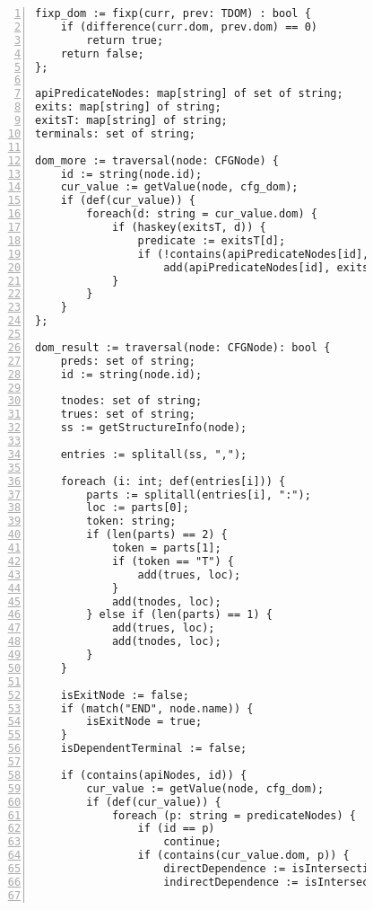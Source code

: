 \begin{figure}[ht!]
\begin{lstlisting}[numbers=left, tabsize=4, escapechar=@, caption={API Usage Mining Analysis},label={lst:aun-code}, lastline = 10]
fixp_dom := fixp(curr, prev: TDOM) : bool {
 	if (difference(curr.dom, prev.dom) == 0)
 		return true;	
 	return false;
};

apiPredicateNodes: map[string] of set of string;
exits: map[string] of string;
exitsT: map[string] of string;
terminals: set of string;

dom_more := traversal(node: CFGNode) {
    id := string(node.id);
    cur_value := getValue(node, cfg_dom);
    if (def(cur_value)) {
        foreach(d: string = cur_value.dom) {
            if (haskey(exitsT, d)) {
                predicate := exitsT[d];  
                if (!contains(apiPredicateNodes[id], predicate))
                    add(apiPredicateNodes[id], exits[d]);
            }
        }
    }
};

dom_result := traversal(node: CFGNode): bool {
    preds: set of string;
    id := string(node.id);
    
    tnodes: set of string;
    trues: set of string;
    ss := getStructureInfo(node);
    
    entries := splitall(ss, ",");
    
    foreach (i: int; def(entries[i])) {
    	parts := splitall(entries[i], ":"); 
    	loc := parts[0]; 
    	token: string;
    	if (len(parts) == 2) {
    	    token = parts[1];
    		if (token == "T") {
    		    add(trues, loc);    
    		}
            add(tnodes, loc);
    	} else if (len(parts) == 1) {
    	    add(trues, loc);  
    		add(tnodes, loc);
    	}
    }
    
    isExitNode := false;
    if (match("END", node.name)) {
        isExitNode = true;
    }
    isDependentTerminal := false;

    if (contains(apiNodes, id)) {
        cur_value := getValue(node, cfg_dom);
        if (def(cur_value)) {
            foreach (p: string = predicateNodes) {
                if (id == p)
                    continue;
                if (contains(cur_value.dom, p)) {
                    directDependence := isIntersectionNotNull(variables[id], variables[p]);
                    indirectDependence := isIntersectionNotNull(allVars, variables[p]);
                    

\end{lstlisting}
\end{figure}
